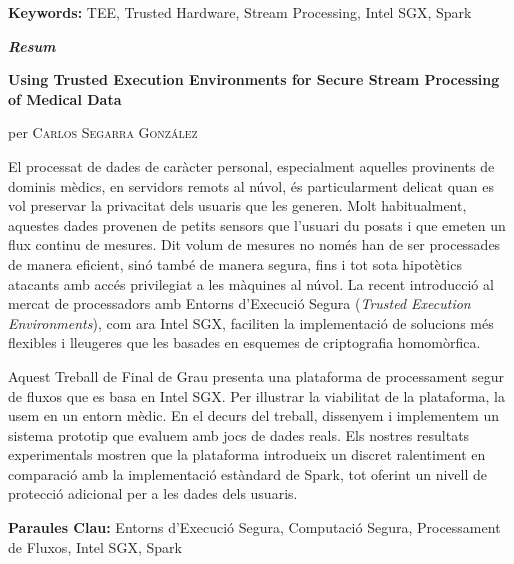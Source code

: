 \vspace{0.5cm}

\textbf{Keywords:} TEE, Trusted Hardware, Stream Processing, Intel SGX, Spark

\vfill
\pagebreak

\vspace*{2cm}
\begin{center}
%
%
%
%
%
%    
%
    \LARGE
    \textit{\textbf{Resum}} 

    \vspace{0.5cm}

    \large
    \textbf{Using Trusted Execution Environments for Secure Stream Processing of Medical Data}

    per \textsc{Carlos Segarra Gonz\'alez}
\end{center}

\vspace{0.5cm}

\normalsize

El processat de dades de car\`acter personal, especialment aquelles provinents de dominis m\`edics, en servidors remots al n\'uvol, \'es particularment delicat quan es vol preservar la privacitat dels usuaris que les generen.
Molt habitualment, aquestes dades provenen de petits sensors que l'usuari du posats i que emeten un flux continu de mesures.
Dit volum de mesures no nom\'es han de ser processades de manera eficient, sin\'o tamb\'e de manera segura, fins i tot sota hipot\`etics atacants amb acc\'es privilegiat a les m\`aquines al n\'uvol.
La recent introducci\'o al mercat de processadors amb Entorns d'Execuci\'o Segura (\textit{Trusted Execution Environments}), com ara Intel SGX, faciliten la implementaci\'o de solucions m\'es flexibles i lleugeres que les basades en esquemes de criptografia homom\`orfica.
    
Aquest Treball de Final de Grau presenta una plataforma de processament segur de fluxos que es basa en Intel SGX.
Per il{\tiny\raisebox{.9ex}{\textbullet}}lustrar la viabilitat de la plataforma, la usem en un entorn m\`edic.
En el decurs del treball, dissenyem i implementem un sistema prototip que evaluem amb jocs de dades reals.
Els nostres resultats experimentals mostren que la plataforma introdueix un discret ralentiment en comparaci\'o amb la implementaci\'o est\`andard de Spark, tot oferint un nivell de protecci\'o adicional per a les dades dels usuaris. 

\vspace{0.5cm}

\textbf{Paraules Clau:} Entorns d'Execuci\'o Segura, Computaci\'o Segura, Processament de Fluxos, Intel SGX, Spark

\vfill
